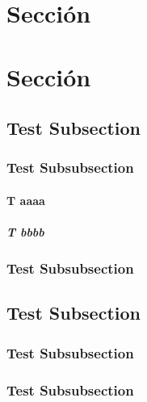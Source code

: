 \section{Sección}
\section{Sección}
\subsection{Test Subsection}
\subsubsection{Test Subsubsection}
\paragraph{T aaaa}
\subparagraph{T bbbb}
\subsubsection{Test Subsubsection}
\subsection{Test Subsection}
\subsubsection{Test Subsubsection}
\subsubsection{Test Subsubsection}